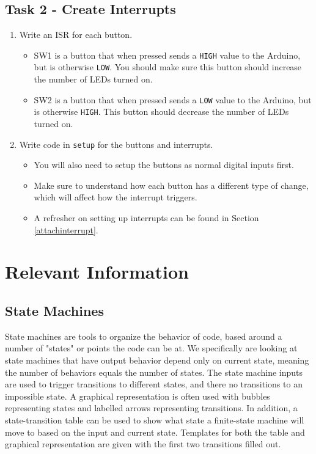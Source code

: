 \documentclass{article}
\begin{document}
    \subsection{Task 2 - Create Interrupts}
        \begin{enumerate}
            \item Write an ISR for each button.
            \begin{itemize}
                \item SW1 is a button that when pressed sends a \texttt{HIGH} value to the Arduino, but is otherwise \texttt{LOW}. You should make sure this button should increase the number of LEDs turned on. 
                \item SW2 is a button that when pressed sends a \texttt{LOW} value to the Arduino, but is otherwise \texttt{HIGH}. This button should decrease the number of LEDs turned on.
            \end{itemize}
            \item Write code in \texttt{setup} for the buttons and interrupts.
            \begin{itemize}
                \item You will also need to setup the buttons as normal digital inputs first. 
                \item Make sure to understand how each button has a different type of change, which will affect how the interrupt triggers.
                \item A refresher on setting up interrupts can be found in Section \ref{attachinterrupt}.
            \end{itemize}
        \end{enumerate}
        

\section{Relevant Information}
    \subsection{State Machines} \label{statemachine}
        State machines are tools to organize the behavior of code, based around a number of "states" or points the code can be at. We specifically are looking at state machines that have output behavior depend only on current state, meaning the number of behaviors equals the number of states. The state machine inputs are used to trigger transitions to different states, and there no transitions to an impossible state. A graphical representation is often used with bubbles representing states and labelled arrows representing transitions. In addition, a state-transition table can be used to show what state a finite-state machine will move to based on the input and current state. Templates for both the table and graphical representation are given with the first two transitions filled out.
        
\end{document}
